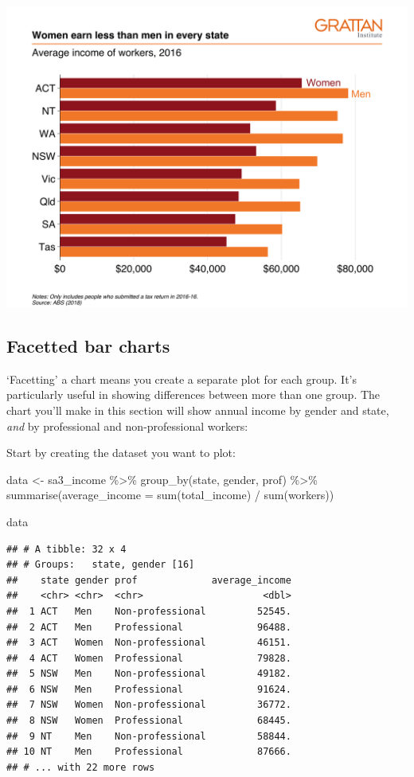 \documentclass[
]{book}
\newenvironment{Shaded}{\begin{snugshade}}{\end{snugshade}}
\newcommand{\AttributeTok}[1]{\textcolor[rgb]{0.77,0.63,0.00}{#1}}
\newcommand{\FunctionTok}[1]{\textcolor[rgb]{0.00,0.00,0.00}{#1}}
\newcommand{\NormalTok}[1]{#1}
\newcommand{\OtherTok}[1]{\textcolor[rgb]{0.56,0.35,0.01}{#1}}
\newcommand{\SpecialCharTok}[1]{\textcolor[rgb]{0.00,0.00,0.00}{#1}}
\begin{document}
\includegraphics[width=44.44in]{atlas/multiple_bar}

\hypertarget{facet-bar}{%
\subsection{Facetted bar charts}\label{facet-bar}}

`Facetting' a chart means you create a separate plot for each group. It's particularly useful in showing differences between more than one group. The chart you'll make in this section will show annual income by gender and state, \emph{and} by professional and non-professional workers:

Start by creating the dataset you want to plot:

\begin{Shaded}
\begin{Highlighting}[]
\NormalTok{data }\OtherTok{\textless{}{-}}\NormalTok{ sa3\_income }\SpecialCharTok{\%\textgreater{}\%} 
  \FunctionTok{group\_by}\NormalTok{(state, gender, prof) }\SpecialCharTok{\%\textgreater{}\%} 
  \FunctionTok{summarise}\NormalTok{(}\AttributeTok{average\_income =} \FunctionTok{sum}\NormalTok{(total\_income) }\SpecialCharTok{/} \FunctionTok{sum}\NormalTok{(workers))}

\NormalTok{data}
\end{Highlighting}
\end{Shaded}

\begin{verbatim}
## # A tibble: 32 x 4
## # Groups:   state, gender [16]
##    state gender prof             average_income
##    <chr> <chr>  <chr>                     <dbl>
##  1 ACT   Men    Non-professional         52545.
##  2 ACT   Men    Professional             96488.
##  3 ACT   Women  Non-professional         46151.
##  4 ACT   Women  Professional             79828.
##  5 NSW   Men    Non-professional         49182.
##  6 NSW   Men    Professional             91624.
##  7 NSW   Women  Non-professional         36772.
##  8 NSW   Women  Professional             68445.
##  9 NT    Men    Non-professional         58844.
## 10 NT    Men    Professional             87666.
## # ... with 22 more rows
\end{verbatim}
\end{document}
